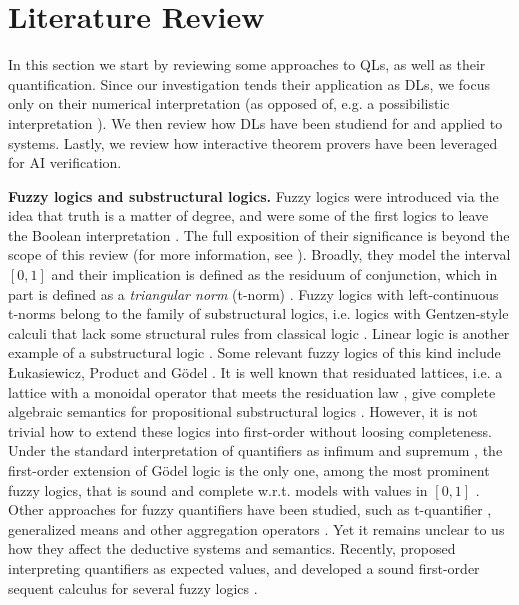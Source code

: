 \section{Literature Review} \label{section:LiteratureReview}

In this section we start by reviewing some approaches to QLs, as well as their quantification. Since our investigation tends their application as DLs, we focus only on their numerical interpretation (as opposed of, e.g. a possibilistic interpretation \citep{LIU19981}). %
We then review how DLs have been studiend for and applied to \InAI{} systems. Lastly, we review how interactive theorem provers have been leveraged for AI verification.

\textbf{Fuzzy logics and substructural logics.} Fuzzy logics were introduced via the idea that truth is a matter of degree, and were some of the first logics to leave the Boolean interpretation \citep{galatos2007residuated}. The full exposition of their significance is beyond the scope of this review (for more information, see \cite{cintula2011handbook, prooffuzzy}). Broadly, they model the interval $[0,1]$ and their implication is defined as the residuum of conjunction, which in part is defined as a \emph{triangular norm} (t-norm) \citep{cintula2011handbook,prooffuzzy}. Fuzzy logics with left-continuous t-norms belong to the family of substructural logics, i.e. logics with Gentzen-style calculi that lack some structural rules from classical logic \citep{galatos2007residuated}. Linear logic is another example of a substructural logic \citep{Wadler1993, agliano2025algebraic, galatos2007residuated}. Some relevant fuzzy logics of this kind include Łukasiewicz, Product and G\"{o}del \citep{cintula2011handbook,prooffuzzy}. It is well known that residuated lattices, i.e. a lattice with a monoidal operator that meets the residuation law \citep{galatos2007residuated}, give complete algebraic semantics for propositional substructural logics \citep{galatos2007residuated}. However, it is not trivial how to extend these logics into first-order without loosing completeness. Under the standard interpretation of quantifiers as infimum and supremum \citep{rescher1969many, cintula2011handbook}, the first-order extension of Gödel logic is the only one, among the most prominent fuzzy logics, that is sound and complete w.r.t. models with values in $[0,1]$ \citep{cintula2011handbook}. Other approaches for fuzzy quantifiers have been studied, such as t-quantifier \citep{LIU19981}, generalized means \citep{badreddine2022logic, slusarz2023logic} and other aggregation operators \citep{LIU19981}. Yet it remains unclear to us how they affect the deductive systems and semantics. Recently, \citeauthor{slusarz2023logic} proposed interpreting quantifiers as expected values, and developed a sound first-order sequent calculus for several fuzzy logics \citep{slusarz2023logic}.

